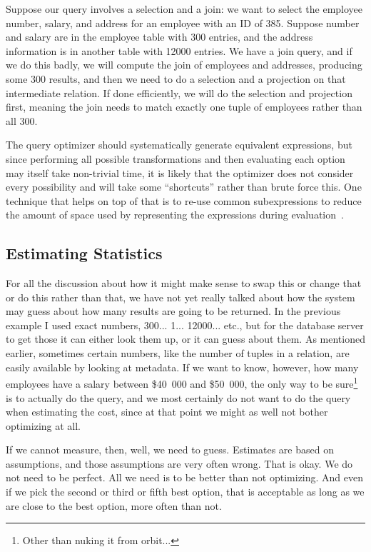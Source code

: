 Suppose our query involves a selection and a join: we want to select the employee number, salary, and address for an employee with an ID of 385. Suppose number and salary are in the employee table with 300 entries, and the address information is in another table with 12000 entries. We have a join query, and if we do this badly, we will compute the join of employees and addresses, producing some 300 results, and then we need to do a selection and a projection on that intermediate relation. If done efficiently, we will do the selection and projection first, meaning the join needs to match exactly one tuple of employees rather than all 300. 

The query optimizer should systematically generate equivalent expressions, but since performing all possible transformations and then evaluating each option may itself take non-trivial time, it is likely that the optimizer does not consider every possibility and will take some ``shortcuts'' rather than brute force this. One technique that helps on top of that is to re-use common subexpressions to reduce the amount of space used by representing the expressions during evaluation~\cite{dsc}.

\subsection*{Estimating Statistics}

For all the discussion about how it might make sense to swap this or change that or do this rather than that, we have not yet really talked about how the system may guess about how many results are going to be returned. In the previous example I used exact numbers, 300... 1... 12000... etc., but for the database server to get those it can either look them up, or it can guess about them. As mentioned earlier, sometimes certain numbers, like the number of tuples in a relation, are easily available by looking at metadata. If we want to know, however, how many employees have a salary between \$40~000 and \$50~000, the only way to be sure\footnote{Other than nuking it from orbit...} is to actually do the query, and we most certainly do not want to do the query when estimating the cost, since at that point we might as well not bother optimizing at all.

If we cannot measure, then, well, we need to guess. Estimates are based on assumptions, and those assumptions are very often wrong. That is okay. We do not need to be perfect. All we need is to be better than not optimizing. And even if we pick the second or third or fifth best option, that is acceptable as long as we are close to the best option, more often than not.

